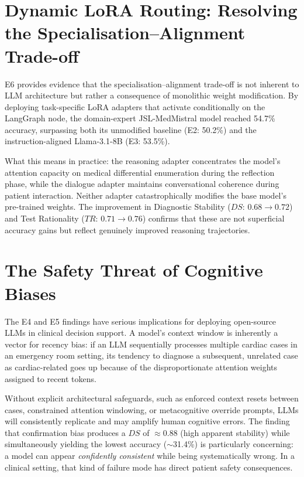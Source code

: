 \section{Dynamic LoRA Routing: Resolving the Specialisation--Alignment Trade-off}

E6 provides evidence that the specialisation--alignment trade-off is not inherent to LLM architecture but rather a consequence of monolithic weight modification. By deploying task-specific LoRA adapters that activate conditionally on the LangGraph node, the domain-expert JSL-MedMistral model reached 54.7\% accuracy, surpassing both its unmodified baseline (E2: 50.2\%) and the instruction-aligned Llama-3.1-8B (E3: 53.5\%).

What this means in practice: the reasoning adapter concentrates the model's attention capacity on medical differential enumeration during the reflection phase, while the dialogue adapter maintains conversational coherence during patient interaction. Neither adapter catastrophically modifies the base model's pre-trained weights. The improvement in Diagnostic Stability ($DS$: $0.68 \to 0.72$) and Test Rationality ($TR$: $0.71 \to 0.76$) confirms that these are not superficial accuracy gains but reflect genuinely improved reasoning trajectories.

\section{The Safety Threat of Cognitive Biases}

The E4 and E5 findings have serious implications for deploying open-source LLMs in clinical decision support. A model's context window is inherently a vector for recency bias: if an LLM sequentially processes multiple cardiac cases in an emergency room setting, its tendency to diagnose a subsequent, unrelated case as cardiac-related goes up because of the disproportionate attention weights assigned to recent tokens.

Without explicit architectural safeguards, such as enforced context resets between cases, constrained attention windowing, or metacognitive override prompts, LLMs will consistently replicate and may amplify human cognitive errors. The finding that confirmation bias produces a $DS$ of $\approx$0.88 (high apparent stability) while simultaneously yielding the lowest accuracy ($\sim$31.4\%) is particularly concerning: a model can appear \textit{confidently consistent} while being systematically wrong. In a clinical setting, that kind of failure mode has direct patient safety consequences.

